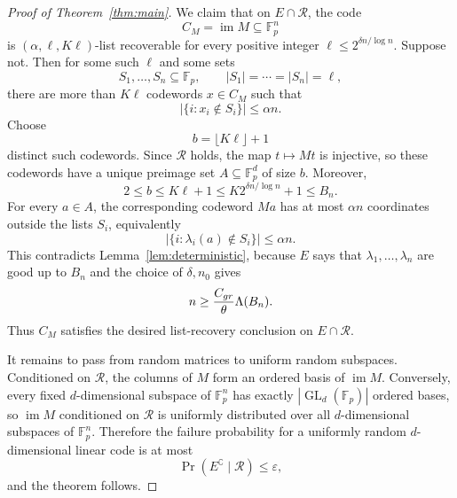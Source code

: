 \documentclass[10pt,a4paper]{amsart}
\newcommand{\Fp}{\mathbb{F}_p}
\DeclareMathOperator{\GL}{GL}
\begin{document}
\begin{proof}[Proof of Theorem~\ref{thm:main}]
We claim that on $E\cap\mathcal R$, the code
\[
C_M=\operatorname{im}M\subseteq\Fp^n
\]
is $(\alpha,\ell,K\ell)$-list recoverable for every positive integer $\ell\le 2^{\delta n/\log n}$. Suppose not. Then for some such $\ell$ and some sets
\[
S_1,\ldots,S_n\subseteq\Fp,
\qquad |S_1|=\cdots=|S_n|=\ell,
\]
there are more than $K\ell$ codewords $x\in C_M$ such that
\[
\left|\{i:x_i\notin S_i\}\right|\le\alpha n.
\]
Choose
\[
b=\lfloor K\ell\rfloor+1
\]
distinct such codewords. Since $\mathcal R$ holds, the map $t\mapsto Mt$ is injective, so these codewords have a unique preimage set $A\subseteq\Fp^d$ of size $b$. Moreover,
\[
2\le b\le K\ell+1\le K2^{\delta n/\log n}+1\le B_n.
\]
For every $a\in A$, the corresponding codeword $Ma$ has at most $\alpha n$ coordinates outside the lists $S_i$, equivalently
\[
\left|\{i:\lambda_i(a)\notin S_i\}\right|\le\alpha n.
\]
This contradicts Lemma~\ref{lem:deterministic}, because $E$ says that $\lambda_1,\ldots,\lambda_n$ are good up to $B_n$ and the choice of $\delta,n_0$ gives
\[
n\ge \frac{C_{\rm gr}}{\theta}\Lambda(B_n).
\]
Thus $C_M$ satisfies the desired list-recovery conclusion on $E\cap\mathcal R$.

It remains to pass from random matrices to uniform random subspaces. Conditioned on $\mathcal R$, the columns of $M$ form an ordered basis of $\operatorname{im}M$. Conversely, every fixed $d$-dimensional subspace of $\Fp^n$ has exactly $|\GL_d(\Fp)|$ ordered bases, so $\operatorname{im}M$ conditioned on $\mathcal R$ is uniformly distributed over all $d$-dimensional subspaces of $\Fp^n$. Therefore the failure probability for a uniformly random $d$-dimensional linear code is at most
\[
\Pr(E^\complement\mid\mathcal R)\le\varepsilon,
\]
and the theorem follows.
\end{proof}
\end{document}
